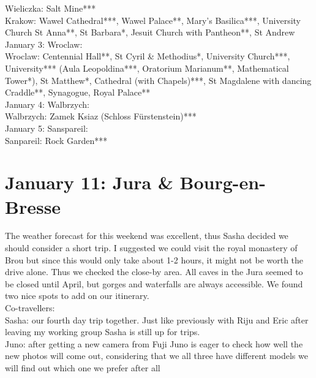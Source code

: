 Wieliczka: Salt Mine***\\
Krakow: Wawel Cathedral***, Wawel Palace**, Mary's Basilica***, University Church St Anna**, St Barbara*, Jesuit Church with Pantheon**, St Andrew\\

January 3: Wroclaw:\\

Wroclaw: Centennial Hall**, St Cyril \& Methodius*, University Church***, University*** (Aula Leopoldina***, Oratorium Marianum**, Mathematical Tower*), St Matthew*, Cathedral (with Chapels)***, St Magdalene with dancing Craddle**, Synagogue, Royal Palace**\\

January 4: Walbrzych:\\

Walbrzych: Zamek Ksiaz (Schloss F\"urstenstein)***\\

January 5: Sanspareil:\\

Sanpareil: Rock Garden***\\

\section{January 11: Jura \& Bourg-en-Bresse}
\label{2020:BourgEnBresse}

The weather forecast for this weekend was excellent, thus Sasha decided we should consider a short trip. I suggested we could visit the royal monastery of Brou but since this would only take about 1-2 hours, it might not be worth the drive alone. Thus we checked the close-by area. All caves in the Jura seemed to be closed until April, but gorges and waterfalls are always accessible. We found two nice spots to add on our itinerary.\\

Co-travellers:\\
Sasha: our fourth day trip together. Just like previously with Riju and Eric after leaving my working group Sasha is still up for trips. \\

Juno: after getting a new camera from Fuji Juno is eager to check how well the new photos will come out, considering that we all three have different models we will find out which one we prefer after all\\

